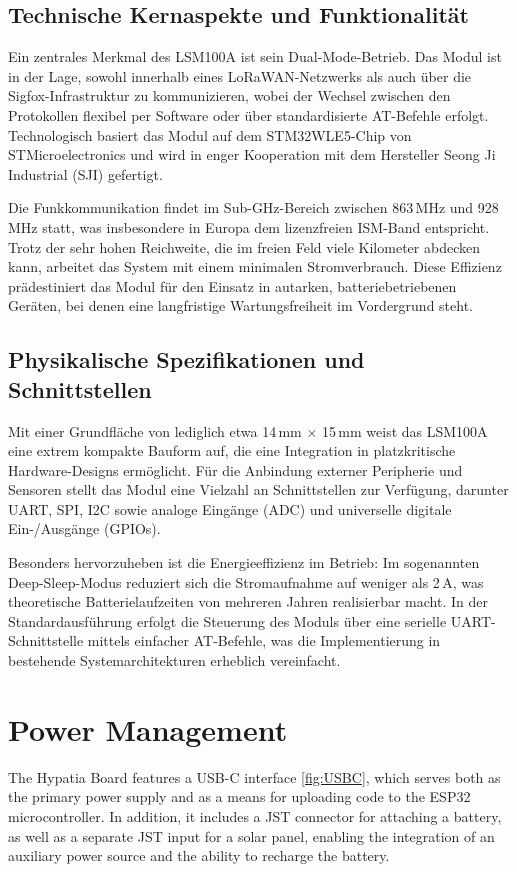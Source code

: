 \subsection{Technische Kernaspekte und Funktionalität}
Ein zentrales Merkmal des LSM100A ist sein Dual-Mode-Betrieb. Das Modul ist in der Lage, sowohl innerhalb eines LoRaWAN-Netzwerks als auch über die Sigfox-Infrastruktur zu kommunizieren, wobei der Wechsel zwischen den Protokollen flexibel per Software oder über standardisierte AT-Befehle erfolgt. Technologisch basiert das Modul auf dem STM32WLE5-Chip von STMicroelectronics und wird in enger Kooperation mit dem Hersteller Seong Ji Industrial (SJI) gefertigt. 

Die Funkkommunikation findet im Sub-GHz-Bereich zwischen 863\,MHz und 928\,MHz statt, was insbesondere in Europa dem lizenzfreien ISM-Band entspricht. Trotz der sehr hohen Reichweite, die im freien Feld viele Kilometer abdecken kann, arbeitet das System mit einem minimalen Stromverbrauch. Diese Effizienz prädestiniert das Modul für den Einsatz in autarken, batteriebetriebenen Geräten, bei denen eine langfristige Wartungsfreiheit im Vordergrund steht.

\subsection{Physikalische Spezifikationen und Schnittstellen}
Mit einer Grundfläche von lediglich etwa 14\,mm $\times$ 15\,mm weist das LSM100A eine extrem kompakte Bauform auf, die eine Integration in platzkritische Hardware-Designs ermöglicht. Für die Anbindung externer Peripherie und Sensoren stellt das Modul eine Vielzahl an Schnittstellen zur Verfügung, darunter UART, SPI, I2C sowie analoge Eingänge (ADC) und universelle digitale Ein-/Ausgänge (GPIOs). 

Besonders hervorzuheben ist die Energieeffizienz im Betrieb: Im sogenannten Deep-Sleep-Modus reduziert sich die Stromaufnahme auf weniger als 2\,\textmu A, was theoretische Batterielaufzeiten von mehreren Jahren realisierbar macht. In der Standardausführung erfolgt die Steuerung des Moduls über eine serielle UART-Schnittstelle mittels einfacher AT-Befehle, was die Implementierung in bestehende Systemarchitekturen erheblich vereinfacht.

\section{Power Management}
The Hypatia Board features a USB-C interface \ref{fig:USBC}, which serves both as the primary power supply and as a means for uploading code to the ESP32 microcontroller. In addition, it includes a JST connector for attaching a battery, as well as a separate JST input for a solar panel, enabling the integration of an auxiliary power source and the ability to recharge the battery.

